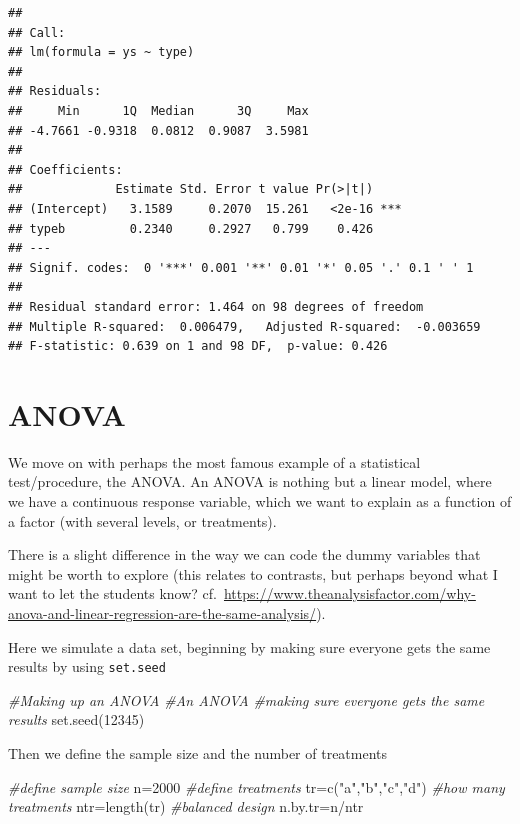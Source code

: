 \documentclass[
]{book}
\newenvironment{Shaded}{\begin{snugshade}}{\end{snugshade}}
\newcommand{\CommentTok}[1]{\textcolor[rgb]{0.56,0.35,0.01}{\textit{#1}}}
\newcommand{\DecValTok}[1]{\textcolor[rgb]{0.00,0.00,0.81}{#1}}
\newcommand{\FunctionTok}[1]{\textcolor[rgb]{0.00,0.00,0.00}{#1}}
\newcommand{\NormalTok}[1]{#1}
\newcommand{\OtherTok}[1]{\textcolor[rgb]{0.56,0.35,0.01}{#1}}
\newcommand{\SpecialCharTok}[1]{\textcolor[rgb]{0.00,0.00,0.00}{#1}}
\newcommand{\StringTok}[1]{\textcolor[rgb]{0.31,0.60,0.02}{#1}}
\begin{document}
\begin{verbatim}
## 
## Call:
## lm(formula = ys ~ type)
## 
## Residuals:
##     Min      1Q  Median      3Q     Max 
## -4.7661 -0.9318  0.0812  0.9087  3.5981 
## 
## Coefficients:
##             Estimate Std. Error t value Pr(>|t|)    
## (Intercept)   3.1589     0.2070  15.261   <2e-16 ***
## typeb         0.2340     0.2927   0.799    0.426    
## ---
## Signif. codes:  0 '***' 0.001 '**' 0.01 '*' 0.05 '.' 0.1 ' ' 1
## 
## Residual standard error: 1.464 on 98 degrees of freedom
## Multiple R-squared:  0.006479,   Adjusted R-squared:  -0.003659 
## F-statistic: 0.639 on 1 and 98 DF,  p-value: 0.426
\end{verbatim}

\hypertarget{anova}{%
\section{ANOVA}\label{anova}}

We move on with perhaps the most famous example of a statistical test/procedure, the ANOVA. An ANOVA is nothing but a linear model, where we have a continuous response variable, which we want to explain as a function of a factor (with several levels, or treatments).

There is a slight difference in the way we can code the dummy variables that might be worth to explore (this relates to contrasts, but perhaps beyond what I want to let the students know? cf.~\url{https://www.theanalysisfactor.com/why-anova-and-linear-regression-are-the-same-analysis/}).

Here we simulate a data set, beginning by making sure everyone gets the same results by using \texttt{set.seed}

\begin{Shaded}
\begin{Highlighting}[]
\CommentTok{\#Making up an ANOVA}
\CommentTok{\#An ANOVA}
\CommentTok{\#making sure everyone gets the same results}
\FunctionTok{set.seed}\NormalTok{(}\DecValTok{12345}\NormalTok{)}
\end{Highlighting}
\end{Shaded}

Then we define the sample size and the number of treatments

\begin{Shaded}
\begin{Highlighting}[]
\CommentTok{\#define sample size}
\NormalTok{n}\OtherTok{=}\DecValTok{2000}
\CommentTok{\#define treatments}
\NormalTok{tr}\OtherTok{=}\FunctionTok{c}\NormalTok{(}\StringTok{"a"}\NormalTok{,}\StringTok{"b"}\NormalTok{,}\StringTok{"c"}\NormalTok{,}\StringTok{"d"}\NormalTok{)}
\CommentTok{\#how many treatments}
\NormalTok{ntr}\OtherTok{=}\FunctionTok{length}\NormalTok{(tr)}
\CommentTok{\#balanced design}
\NormalTok{n.by.tr}\OtherTok{=}\NormalTok{n}\SpecialCharTok{/}\NormalTok{ntr}
\end{Highlighting}
\end{Shaded}
\end{document}
